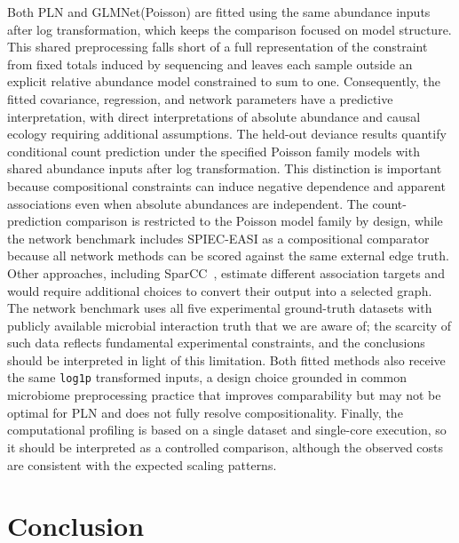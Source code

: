 \documentclass[USenglish]{article}
\theoremstyle{dgthm}
\begin{document}
Both PLN and GLMNet(Poisson) are fitted using the same abundance inputs after log transformation, which keeps the comparison focused on model structure.
This shared preprocessing falls short of a full representation of the constraint from fixed totals induced by sequencing and leaves each sample outside an explicit relative abundance model constrained to sum to one.
Consequently, the fitted covariance, regression, and network parameters have a predictive interpretation, with direct interpretations of absolute abundance and causal ecology requiring additional assumptions.
The held-out deviance results quantify conditional count prediction under the specified Poisson family models with shared abundance inputs after log transformation.
This distinction is important because compositional constraints can induce negative dependence and apparent associations even when absolute abundances are independent.
The count-prediction comparison is restricted to the Poisson model family by design, while the network benchmark includes SPIEC-EASI as a compositional comparator because all network methods can be scored against the same external edge truth.
Other approaches, including SparCC~\citep{Friedman2012SparCC}, estimate different association targets and would require additional choices to convert their output into a selected graph.
The network benchmark uses all five experimental ground-truth datasets with publicly available microbial interaction truth that we are aware of; the scarcity of such data reflects fundamental experimental constraints, and the conclusions should be interpreted in light of this limitation.
Both fitted methods also receive the same \texttt{log1p} transformed inputs, a design choice grounded in common microbiome preprocessing practice that improves comparability but may not be optimal for PLN and does not fully resolve compositionality.
Finally, the computational profiling is based on a single dataset and single-core execution, so it should be interpreted as a controlled comparison, although the observed costs are consistent with the expected scaling patterns.

\section{Conclusion}
\label{sec:conclusion}
\end{document}

